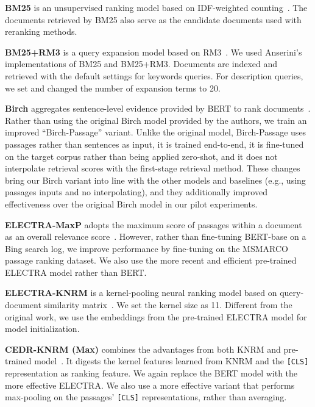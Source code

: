 {\bf BM25} 
is  an  unsupervised  ranking  model  based  on  IDF-weighted counting~\cite{DBLP:conf/trec/RobertsonWHGP95}.
The documents retrieved by BM25 also serve as the candidate documents used with reranking methods.

{\bf BM25+RM3} is a query expansion model based on RM3~\cite{DBLP:conf/sigir/LavrenkoC01}.
We used Anserini's~\cite{DBLP:journals/jdiq/YangFL18} implementations of BM25 and BM25+RM3.
Documents are indexed and retrieved with the default settings for keywords queries.
For description queries, we set  and changed the number of expansion terms to 20.


{\bf Birch} 
aggregates sentence-level evidence provided by BERT to rank documents~\cite{DBLP:conf/emnlp/YilmazWYZL19}.
Rather than using the original Birch model provided by the authors, we train an improved ``Birch-Passage'' variant.
Unlike the original model, Birch-Passage uses passages rather than sentences as input, it is trained end-to-end, it is fine-tuned on the target corpus rather than being applied zero-shot, and it does not interpolate retrieval scores with the first-stage retrieval method.
These changes bring our Birch variant into line with the other models and baselines (e.g., using passages inputs and no interpolating), and they additionally improved effectiveness over the original Birch model in our pilot experiments.

{\bf ELECTRA-MaxP}
adopts the maximum score of passages within a document as an overall relevance score~\cite{DBLP:conf/sigir/DaiC19}.
However, rather than fine-tuning BERT-base on a Bing search log, we improve performance by fine-tuning on the MSMARCO passage ranking dataset.
We also use the more recent and efficient pre-trained ELECTRA model rather than BERT.

{\bf ELECTRA-KNRM} 
is a kernel-pooling neural ranking model based on query-document similarity matrix~\cite{DBLP:conf/sigir/XiongDCLP17}.
We set the kernel size as 11.
Different from the original work, we use the embeddings from the pre-trained ELECTRA model for model initialization.

{\bf CEDR-KNRM (Max)}
combines the advantages from both KNRM and pre-trained model~\cite{DBLP:conf/sigir/MacAvaneyYCG19}.
It digests the kernel features learned from KNRM and the \texttt{[CLS]} representation as ranking feature. We again replace the BERT model with the more effective ELECTRA.
We also use a more effective variant that performs max-pooling on the passages' \texttt{[CLS]} representations, rather than averaging.

